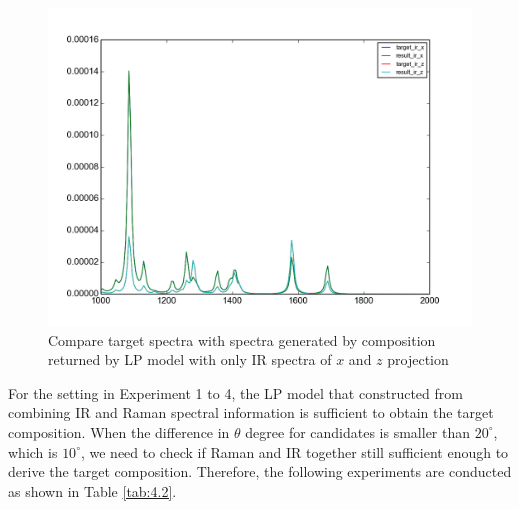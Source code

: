 \begin{figure}[!ht] \label{fig:4.1}
\centering
\includegraphics[scale=0.5]{Figures/ir_xz_result_plotting.png}
\caption{Compare target spectra with spectra generated by composition returned by LP model with only IR spectra of $x$ and $z$ projection} 
\end{figure}

For the setting in Experiment 1 to 4, the LP model that constructed from combining IR and Raman spectral information is sufficient to obtain the target composition. When the difference in $\theta$ degree for candidates is smaller than $20^{\circ}$, which is $10^{\circ}$, we need to check if Raman and IR together still sufficient enough to derive the target composition. Therefore, the following experiments are conducted as shown in Table \ref{tab:4.2}. \\


